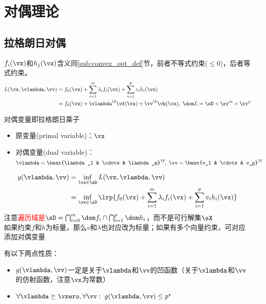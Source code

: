
\section{对偶理论}
\subsection{拉格朗日对偶}
\begin{definition}
$f_i(\vx)$和$h_j(\vx)$含义同\ref{sub:convex_opt_def}节，前者不等式约束($\leq 0$)，后者等式约束。
\[\begin{aligned}
    L(\vx,\vlambda,\vv)&=f_0(\vx)+\sum_{i=1}^m\lambda_if_i(\vx)+\sum_{i=1}^pv_ih_i(\vx)\\
    &=f_0(\vx) + \vlambda^\T \vf(\vx)+\vv^\T \vh(\vx),\;\dom L=\sD\times \rr^m\times \rr^p
\end{aligned}\]
\end{definition}

\begin{definition}
    对偶变量即拉格朗日乘子
\begin{itemize}
\item 原变量(primal variable)：$\vx$
\item 对偶变量(dual variable)：$\vlambda=\bmat{\lambda_1 & \cdots & \lambda_m}^\T,\;\vv=\bmat{v_1 & \cdots & v_p}^\T$
\end{itemize}
\end{definition}

\begin{definition}[拉格朗日对偶函数]
\[\begin{aligned}
    g(\vlambda,\vv)&=\inf_{\vx\in\sD} L(\vx,\vlambda,\vv)\\
    &=\inf_{\vx\in\sD}\lrp{f_0(\vx)+\sum_{i=1}^m\lambda_if_i(\vx)+\sum_{i=1}^pv_ih_i(\vx)}
\end{aligned}\]
注意\textcolor{red}{遍历域是$\sD=\bigcap_{i=0}^m\dom f_i\cap\bigcap_{i=1}^p\dom h_i$}，而不是可行解集$\sX$\\
如果约束$f$和$h$为标量，那么$v$和$\lambda$也对应改为标量；如果有多个向量约束，可对应添加对偶变量
\end{definition}

有以下两点性质：
\begin{itemize}
    \item $g(\vlambda,\vv)$一定是关于$\vlambda$和$\vv$的凹函数（关于$\vlambda$和$\vv$的仿射函数，注意$\vx$为常数）
    \item $\forall\vlambda\succeq \vzero,\forall \vv:\;g(\vlambda,\vv)\leq p^\star$
\end{itemize}

